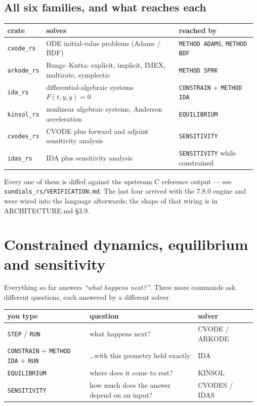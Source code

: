 \documentclass[11pt]{article}
\newcommand{\kw}[1]{\texttt{\uppercase{#1}}}
\newcommand{\code}[1]{\texttt{#1}}
\begin{document}
\subsection{All six families, and what reaches each}

\begin{center}
\begin{tabular}{p{2.6cm}p{6.6cm}p{4.6cm}}
\textbf{crate} & \textbf{solves} & \textbf{reached by}\\\hline
\code{cvode\_rs}  & ODE initial-value problems (Adams / BDF) & \kw{method adams}, \kw{method bdf}\\
\code{arkode\_rs} & Runge--Kutta: explicit, implicit, IMEX, multirate, symplectic & \kw{method sprk}\\
\code{ida\_rs}    & differential-algebraic systems $F(t,y,\dot y)=0$ & \kw{constrain} + \kw{method ida}\\
\code{kinsol\_rs} & nonlinear algebraic systems, Anderson acceleration & \kw{equilibrium}\\
\code{cvodes\_rs} & CVODE plus forward and adjoint sensitivity analysis & \kw{sensitivity}\\
\code{idas\_rs}   & IDA plus sensitivity analysis & \kw{sensitivity} while constrained\\
\end{tabular}
\end{center}

Every one of them is diffed against the upstream C reference output ---
see \code{sundials\_rs/VERIFICATION.md}. The last four arrived with the
7.8.0 engine and were wired into the language afterwards; the shape of
that wiring is in ARCHITECTURE.md \S3.9.

\section{Constrained dynamics, equilibrium and sensitivity}

Everything so far answers \emph{``what happens next?''}. Three more
commands ask different questions, each answered by a different solver.

\begin{center}
\begin{tabular}{p{5.4cm}p{5.6cm}p{2.8cm}}
\textbf{you type} & \textbf{question} & \textbf{solver}\\\hline
\kw{step} / \kw{run} & what happens next? & CVODE / ARKODE\\
\kw{constrain} + \kw{method ida} + \kw{run} & \dots with this geometry held exactly & IDA\\
\kw{equilibrium} & where does it come to rest? & KINSOL\\
\kw{sensitivity} & how much does the answer depend on an input? & CVODES / IDAS\\
\end{tabular}
\end{center}
\end{document}
